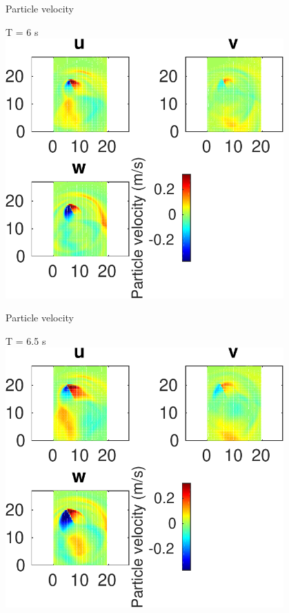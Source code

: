 \documentclass{beamer}
\begin{document}
\begin{frame}
 {Particle velocity}
 
 \centering \Large T = 6 s\\
 \includegraphics[width=0.8\textwidth]{images/horizontal_velo_00066}
 
\end{frame}

\begin{frame}
 {Particle velocity}
 
 \centering \Large T = 6.5 s\\
 \includegraphics[width=0.8\textwidth]{images/horizontal_velo_00071}
 
\end{frame}
\end{document}
